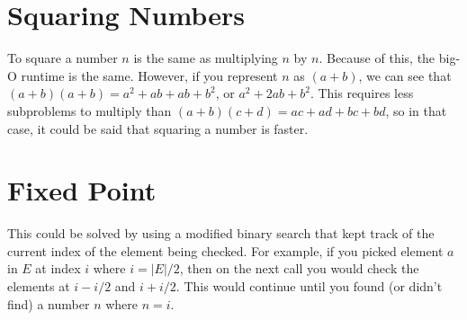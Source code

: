 \documentclass[14pt, letterpaper]{article}
\begin{document}
\section{Squaring Numbers}
To square a number $n$ is the same as multiplying $n$ by $n$. Because of this,
the big-O runtime is the same. However, if you represent $n$ as $(a + b)$,
we can see that $(a + b)(a + b) = a^2 + ab + ab + b^2$, or $a^2 + 2ab + b^2$.
This requires less subproblems to multiply than
$(a + b)(c + d) = ac + ad + bc + bd$, so in that case, it could be said that
squaring a number is faster.

\section{Fixed Point}
This could be solved by using a modified binary search that kept track of the
current index of the element being checked. For example, if you picked element
$a$ in $E$ at index $i$ where $i = |E|/2$, then on the next call you would 
check the elements at $i - i/2$ and $i + i/2$. This would continue until you
found (or didn't find) a number $n$ where $n = i$.
\end{document}
